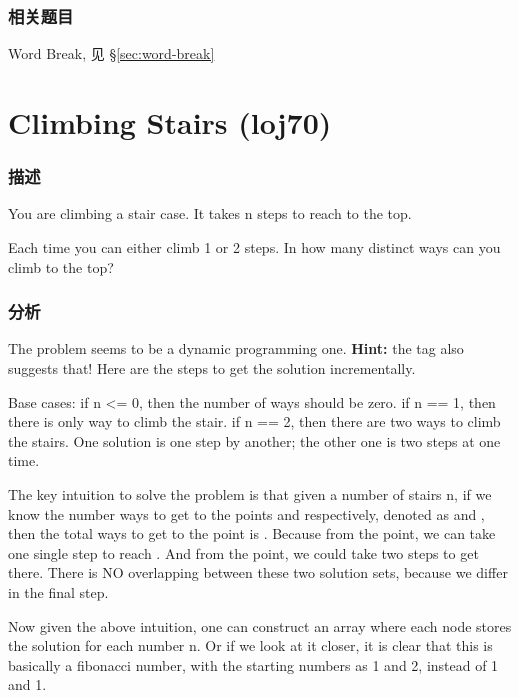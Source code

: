 \subsubsection{相关题目}
\begindot
\item Word Break, 见 \S \ref{sec:word-break}
\myenddot


\section{Climbing Stairs (loj70)} %
\label{sec:climbing-stairs}

\subsubsection{描述}
You are climbing a stair case. It takes n steps to reach to the top.

Each time you can either climb 1 or 2 steps. In how many distinct ways can you climb to the top?

\subsubsection{分析}

The problem seems to be a dynamic programming one. \textbf{Hint:} the tag also suggests that! Here are the steps to get the solution incrementally.

\begindot
\item Base cases: if n <= 0, then the number of ways should be zero. if n == 1, then there is only way to climb the stair. if n == 2, then there are two ways to climb the stairs. One solution is one step by another; the other one is two steps at one time.

\item The key intuition to solve the problem is that given a number of stairs n, if we know the number ways to get to the points \fn{[n-1]} and \fn{[n-2]} respectively, denoted as  and  , then the total ways to get to the point \fn{[n]} is . Because from the \fn{[n-1]} point, we can take one single step to reach \fn{[n]}. And from the \fn{[n-2]} point, we could take two steps to get there. There is NO overlapping between these two solution sets, because we differ in the final step.
\myenddot

Now given the above intuition, one can construct an array where each node stores the solution for each number n. Or if we look at it closer, it is clear that this is basically a fibonacci number, with the starting numbers as 1 and 2, instead of 1 and 1.

